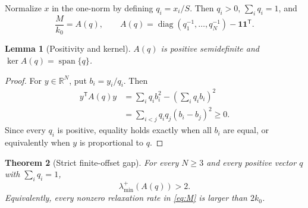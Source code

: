 \documentclass[11pt]{article}
\newtheorem{theorem}{Theorem}
\newtheorem{lemma}[theorem]{Lemma}
\newcommand{\one}{\bm{1}}
\newcommand{\diag}{\operatorname{diag}}
\begin{document}
Normalize $x$ in the one-norm by defining $q_i=x_i/S$.  Then $q_i>0$,
$\sum_iq_i=1$, and
\begin{equation}
 \frac{M}{k_0}=A(q),\qquad
 A(q)=\diag(q_1^{-1},\ldots,q_N^{-1})-\one\one^{\mathsf T}. \label{eq:Aq}
\end{equation}

\begin{lemma}[Positivity and kernel]
$A(q)$ is positive semidefinite and $\ker A(q)=\operatorname{span}\{q\}$.
\end{lemma}

\begin{proof}
For $y\in\mathbb R^N$, put $b_i=y_i/q_i$.  Then
\begin{align}
 y^{\mathsf T}A(q)y
 &=\sum_iq_i b_i^2-\left(\sum_iq_i b_i\right)^2 \\
 &=\sum_{i<j}q_iq_j(b_i-b_j)^2\geq0.                         \label{eq:variance}
\end{align}
Since every $q_i$ is positive, equality holds exactly when all $b_i$ are equal,
or equivalently when $y$ is proportional to $q$.
\end{proof}

\begin{theorem}[Strict finite-offset gap]
\label{thm:gap}
For every $N\geq3$ and every positive vector $q$ with $\sum_iq_i=1$,
\begin{equation}
 \lambda_{\min}^{+}\!\left(A(q)\right)>2.                  \label{eq:gap}
\end{equation}
Equivalently, every nonzero relaxation rate in \eqref{eq:M} is larger than
$2k_0$.
\end{theorem}
\end{document}
